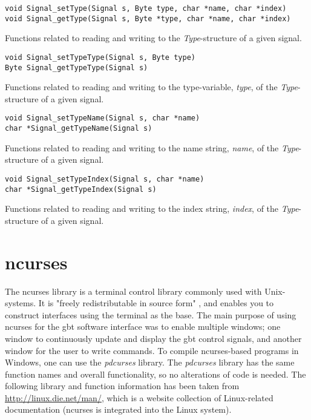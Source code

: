 \documentclass[main.tex]{subfiles}
\begin{document}
\begin{lstlisting}[frame=single] 
void Signal_setType(Signal s, Byte type, char *name, char *index)
void Signal_getType(Signal s, Byte *type, char *name, char *index)
\end{lstlisting}
Functions related to reading and writing to the \textit{Type}-structure of a given signal.\\

\begin{lstlisting}[frame=single] 
void Signal_setTypeType(Signal s, Byte type)
Byte Signal_getTypeType(Signal s)
\end{lstlisting}
Functions related to reading and writing to the type-variable, \textit{type}, of the \textit{Type}-structure of a given signal.\\

\begin{lstlisting}[frame=single] 
void Signal_setTypeName(Signal s, char *name)
char *Signal_getTypeName(Signal s)
\end{lstlisting}
Functions related to reading and writing to the name string, \textit{name}, of the \textit{Type}-structure of a given signal.\\

\begin{lstlisting}[frame=single] 
void Signal_setTypeIndex(Signal s, char *name)
char *Signal_getTypeIndex(Signal s)
\end{lstlisting}
Functions related to reading and writing to the index string, \textit{index}, of the \textit{Type}-structure of a given signal.

\section{ncurses} \label{sec:ncurses}

The ncurses library is a terminal control library commonly used with Unix-systems. It is "freely redistributable in source form" \cite{ncursesdoc}, and enables you to construct interfaces using the terminal as the base. The main purpose of using ncurses for the \gls{gbt} software interface was to enable multiple windows; one window to continuously update and display the \gls{gbt} control signals, and another window for the user to write commands. To compile ncurses-based programs in Windows, one can use the \textit{pdcurses} library. The \textit{pdcurses} library has the same function names and overall functionality, so no alterations of code is needed. The following library and function information has been taken from \url{http://linux.die.net/man/}, which is a website collection of Linux-related documentation (ncurses is integrated into the Linux system). 
\end{document}
